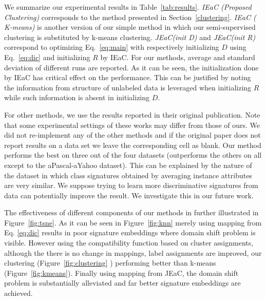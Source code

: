 \documentclass[letterpaper]{article}
\begin{document}
We summarize our experimental results in Table~\ref{tab:results}.
\textit{IEaC (Proposed Clustering)} corresponds to the method presented in Section~\ref{clustering}.
\textit{IEaC ( K-means)} is another version of our simple  method in which our semi-supervised clustering is substituted by k-means clustering.
\textit{JEaC(init D)} and \textit{JEaC(init R)} correspond to optimizing Eq.~\eqref{eq:main}
with respectively initializing $D$ using Eq.~\eqref{eq:dic} and initializing $R$ by IEaC.
For our methods, average and standard deviation of different runs are reported. As it can be seen, the initialization done
by IEaC has critical effect on the performance. This can be justified by noting the information from structure of
unlabeled data is leveraged when initializing $R$ while such information is absent in initializing $D$.

 For other methods, we use the results reported in their original publication. Note that some experimental settings of these works may differ from those of ours. We did not re-implement any of the other methods and if the original paper does not report results on a data set we leave the corresponding cell as blank.
Our method performs the best on three out of the four datasets (outperforms the others on all except to the aPascal-aYahoo dataset). This can be explained by the nature of the dataset in which class signatures obtained by averaging instance attributes are very similar. We suppose trying to learn
more discriminative signatures from data can potentially improve the result. We investigate this in our future work.

The effectiveness of different components of our methods in further illustrated in Figure~\ref{fig:tsne}. As it can be seen in
Figure~\ref{fig:knn} merely using mapping from Eq. \eqref{eq:dic} results in poor signature embeddings where domain shift problem is
visible. However using the compatibility function based on cluster assignments, although the there is no change in mappings,
label assignments are improved, our clustering  (Figure~\ref{fig:clustering} ) performing  better than k-means (Figure~\ref{fig:kmeans}). Finally using
mapping from JEaC, the domain shift problem is substantially alleviated and far better signature embeddings are achieved.



\end{document}
